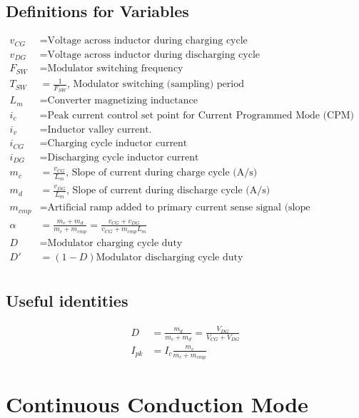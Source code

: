 \documentclass{scrartcl}
\begin{document}
		\subsection{Definitions for Variables}
			
			\begin{align*}
			v_{CG} &= \text{Voltage across inductor during charging cycle} \\
			v_{DG} &= \text{Voltage across inductor during discharging cycle} \\
			F_{SW} &= \text{Modulator switching frequency}\\
			T_{SW} &= \frac{1}{F_{SW}}\text{, Modulator switching (sampling) period} \\
			L_m &= \text{Converter magnetizing inductance} \\
			i_c &= \text{Peak current control set point for Current Programmed Mode (CPM) control}\\
				i_v &= \text{Inductor valley current.} \\
			i_{CG} &= \text{Charging cycle inductor current} \\
			i_{DG} &= \text{Discharging cycle inductor current} \\	
			m_c &= \frac{v_{CG}} {L_m}\text{, Slope of current during charge cycle (A/s)} \\
			m_d &= \frac{v_{DG}} {L_m}\text{, Slope of current during discharge cycle (A/s)}\\
			m_{cmp} &= \text{Artificial ramp added to primary current sense signal (slope compensation) (A/s)}\\
			\alpha &= \frac{m_c + m_d} {m_c + m_{cmp}} =  \frac{v_{CG} + v_{DG}} {v_{CG} + m_{cmp} L_m}\\
			D &= \text{Modulator charging cycle duty} \\
			D' &= (1-D) \text{Modulator discharging cycle duty}\\	
			\end{align*}
			
			\subsection{Useful identities}
			\begin{align}
				D &= \frac{m_d}{m_c + m_d} = \frac{V_{DG}}{V_{CG}+V_{DG}}\\
				I_{pk} &= I_c\frac{m_c}{m_c+m_{cmp}}
			\end{align}

	\section{Continuous Conduction Mode}
\end{document}
